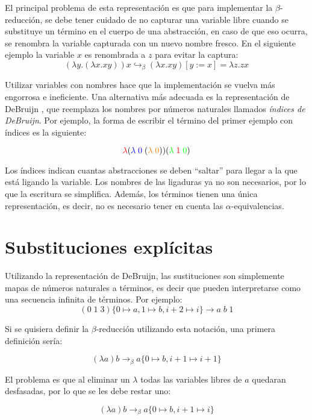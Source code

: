\documentclass[]{report}
\begin{document}
	El principal problema de esta representación es que para implementar la $\beta$-reducción, se debe tener cuidado de no capturar una variable libre cuando se substituye un término en el cuerpo de una abstracción, en caso de que eso ocurra, se renombra la variable capturada con un nuevo nombre fresco.
	En el siguiente ejemplo la variable $x$ es renombrada a $z$ para evitar la captura:
	\[ (\lambda y. (\lambda x. x y)) x \hookrightarrow_{\beta} (\lambda x. x y)[y := x] = \lambda z. z x \]
	
	Utilizar variables con nombres hace que la implementación se vuelva más engorrosa e ineficiente.
	Una alternativa más adecuada es la representación de DeBruijn \cite{debrujin_index}, que reemplaza los nombres por números naturales llamados \textit{índices de DeBruijn}.
	Por ejemplo, la forma de escribir el término del primer ejemplo con índices es la siguiente:
	
	\[ \textcolor{red}{\lambda} (\textcolor{blue}{\lambda\; 0} \; (\textcolor{orange}{\lambda\; 0})) (\textcolor{green}{\lambda}\; \textcolor{red}{1} \; \textcolor{green}{0}) \]

	Los índices indican cuantas abstracciones se deben ``saltar'' para llegar a la que está ligando la variable.
	Los nombres de las ligaduras ya no son necesarios, por lo que la escritura se simplifica.
	Además, los términos tienen una única representación, es decir, no es necesario tener en cuenta las $\alpha$-equivalencias.
	
	
	\section{Substituciones explícitas}
	Utilizando la representación de DeBruijn, las sustituciones son simplemente mapas de números naturales a términos, es decir que pueden interpretarse como una secuencia infinita de términos.
	Por ejemplo:
	\[ (0\; 1\; 3)\{0\mapsto a, 1\mapsto b, i+2\mapsto i\} \rightarrow a\; b\; 1 \]
	
	Si se quisiera definir la $\beta$-reducción utilizando esta notación, una primera definición sería:
	
	\[ (\lambda a)b \rightarrow_{\beta} a \{ 0 \mapsto b, i+1\mapsto i+1 \} \]
	
	El problema es que al eliminar un $\lambda$ todas las variables libres de $a$ quedaran desfasadas, por lo que se les debe restar uno:
	
	\[ (\lambda a)b \rightarrow_{\beta} a \{ 0 \mapsto b, i+1\mapsto i \} \]
	
\end{document}
